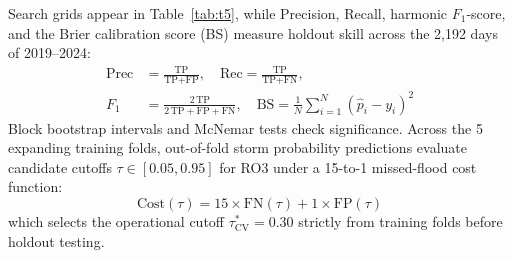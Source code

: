 \documentclass[10pt,twocolumn,a4paper]{article}
\begin{document}
Search grids appear in Table~\ref{tab:t5}, while Precision, Recall, harmonic $F_1$-score, and the Brier calibration score (BS) measure holdout skill across the 2,192 days of 2019--2024:
\begin{equation}
\begin{aligned}
\text{Prec} &= \frac{\text{TP}}{\text{TP}+\text{FP}}, \quad \text{Rec} = \frac{\text{TP}}{\text{TP}+\text{FN}}, \\
F_1 &= \frac{2\,\text{TP}}{2\,\text{TP}+\text{FP}+\text{FN}}, \quad \text{BS} = \frac{1}{N}\sum_{i=1}^{N}(\hat{p}_i - y_i)^2
\end{aligned}
\end{equation}
Block bootstrap intervals and McNemar tests check significance. Across the 5 expanding training folds, out-of-fold storm probability predictions evaluate candidate cutoffs $\tau \in [0.05, 0.95]$ for RO3 under a 15-to-1 missed-flood cost function:
\begin{equation}
\text{Cost}(\tau) = 15 \times \text{FN}(\tau) + 1 \times \text{FP}(\tau)
\end{equation}
which selects the operational cutoff $\tau^*_{\text{CV}} = 0.30$ strictly from training folds before holdout testing.

\begin{table}[H]
\caption{FIVE-FOLD TIME-SERIES CROSS-VALIDATION SEARCH GRIDS AND SELECTED MODEL CONFIGURATIONS}
\label{tab:t5}
\centering
{}
\end{table}
\end{document}
